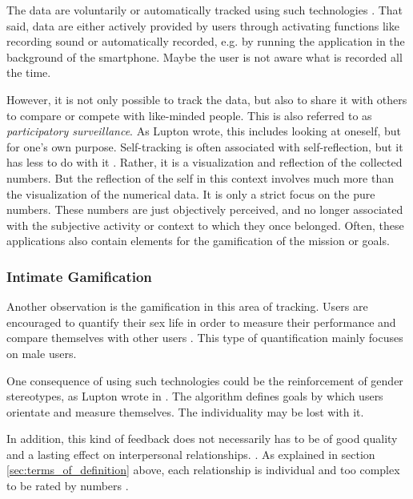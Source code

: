 The data are voluntarily or automatically tracked using such technologies \cite{doi:10.1080/15265161.2017.1409823}. That said, data are either actively provided by users through activating functions like recording sound or automatically recorded, e.g. by running the application in the background of the smartphone. Maybe the user is not aware what is recorded all the time. 

However, it is not only possible to track the data, but also to share it with others to compare or compete with like-minded people.
This is also referred to as \textit{participatory surveillance}. As Lupton \cite{doi:10.1080/13691058.2014.920528} wrote, this includes looking at oneself, but for one's own purpose. Self-tracking is often associated with self-reflection, but it has less to do with it \cite{lupton2016quantified}. Rather, it is a visualization and reflection of the collected numbers. But the reflection of the self in this context involves much more than the visualization of the numerical data. It is only a strict focus on the pure numbers. These numbers are just objectively perceived, and no longer associated with the subjective activity or context to which they once belonged.
Often, these applications also contain elements for the gamification of the mission or goals.

\subsubsection{Intimate Gamification}
Another observation is the gamification in this area of tracking. Users are encouraged to quantify their sex life in order to measure their performance and compare themselves with other users \cite{doi:10.1080/13691058.2014.920528}. This type of quantification mainly focuses on male users.

One consequence of using such technologies could be the reinforcement of gender stereotypes, as Lupton wrote in \cite{doi:10.1080/13691058.2014.920528}. The algorithm defines goals by which users orientate and measure themselves. The individuality may be lost with it.

In addition, this kind of feedback does not necessarily has to be of good quality and a lasting effect on interpersonal relationships. \cite{doi:10.1080/15265161.2017.1409823}.
As explained in section \ref{sec:terms_of_definition} above, each relationship is individual and too complex to be rated by numbers \cite{sassler2010partnering}.

